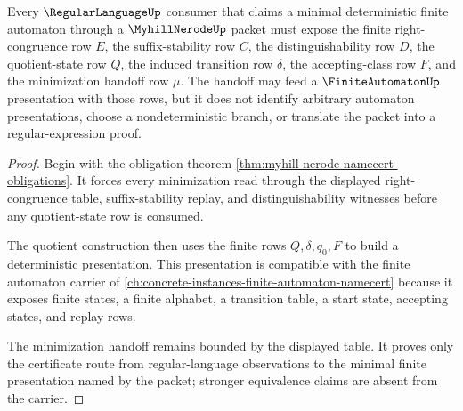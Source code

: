 \begin{theorem}
\label{thm:myhill-nerode-dfa-minimization-handoff}
Every $\RegularLanguageUp$ consumer that claims a minimal deterministic finite automaton through a $\MyhillNerodeUp$ packet must expose the finite right-congruence row $E$, the suffix-stability row $C$, the distinguishability row $D$, the quotient-state row $Q$, the induced transition row $\delta$, the accepting-class row $F$, and the minimization handoff row $\mu$. The handoff may feed a $\FiniteAutomatonUp$ presentation with those rows, but it does not identify arbitrary automaton presentations, choose a nondeterministic branch, or translate the packet into a regular-expression proof.
\end{theorem}
\begin{proof}
Begin with the obligation theorem \autoref{thm:myhill-nerode-namecert-obligations}. It forces every minimization read through the displayed right-congruence table, suffix-stability replay, and distinguishability witnesses before any quotient-state row is consumed.

The quotient construction then uses the finite rows $Q,\delta,q_0,F$ to build a deterministic presentation. This presentation is compatible with the finite automaton carrier of \autoref{ch:concrete-instances-finite-automaton-namecert} because it exposes finite states, a finite alphabet, a transition table, a start state, accepting states, and replay rows.

The minimization handoff remains bounded by the displayed table. It proves only the certificate route from regular-language observations to the minimal finite presentation named by the packet; stronger equivalence claims are absent from the carrier.
\end{proof}


\begin{closurestatus}{\MyhillNerodeUp}
  \theoryclosure{\seedClosure}
  \formalstatus{\unformalizedV}
\end{closurestatus}
